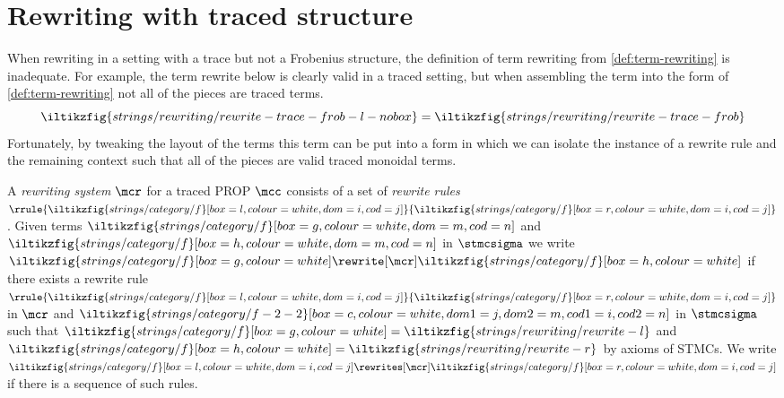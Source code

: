 \section{Rewriting with traced structure}

When rewriting in a setting with a trace but not a Frobenius structure, the
definition of term rewriting from \cref{def:term-rewriting} is inadequate.
For example, the term rewrite below is clearly valid in a traced setting, but
when assembling the term into the form of \cref{def:term-rewriting} not all of
the pieces are traced terms.
\[
    \iltikzfig{strings/rewriting/rewrite-trace-frob-l-nobox}
    =
    \iltikzfig{strings/rewriting/rewrite-trace-frob}
\]
Fortunately, by tweaking the layout of the terms this term can be put into a
form in which we can isolate the instance of a rewrite rule and the remaining
context such that all of the pieces are valid traced monoidal terms.

\begin{definition}\label{def:term-rewriting}
    A \emph{rewriting system} \(\mcr\) for a traced PROP \(\mcc\)
    consists of a set of \emph{rewrite rules} \(
    \rrule{
        \iltikzfig{strings/category/f}[box=l,colour=white,dom=i,cod=j]
    }{
        \iltikzfig{strings/category/f}[box=r,colour=white,dom=i,cod=j]
    }
    \).
    Given terms \(
    \iltikzfig{strings/category/f}[box=g,colour=white,dom=m,cod=n]
    \) and \(
    \iltikzfig{strings/category/f}[box=h,colour=white,dom=m,cod=n]
    \) in \(\stmcsigma\) we write \(
    \iltikzfig{strings/category/f}[box=g,colour=white]
    \rewrite[\mcr]
    \iltikzfig{strings/category/f}[box=h,colour=white]
    \) if there exists a rewrite rule \(\rrule{
        \iltikzfig{strings/category/f}[box=l,colour=white,dom=i,cod=j]
    }{
        \iltikzfig{strings/category/f}[box=r,colour=white,dom=i,cod=j]
    }\) in \(\mcr\) and \(
    \iltikzfig{strings/category/f-2-2}[box=c,colour=white,dom1=j,dom2=m,cod1=i,cod2=n]
    \) in \(\stmcsigma\) such that \(
    \iltikzfig{strings/category/f}[box=g,colour=white]
    =
    \iltikzfig{strings/rewriting/rewrite-l}
    \) and \(
    \iltikzfig{strings/category/f}[box=h,colour=white]
    =
    \iltikzfig{strings/rewriting/rewrite-r}
    \) by axioms of STMCs.
    We write \(
    \iltikzfig{strings/category/f}[box=l,colour=white,dom=i,cod=j]
    \rewrites[\mcr]
    \iltikzfig{strings/category/f}[box=r,colour=white,dom=i,cod=j]
    \) if there is a sequence of such rules.
\end{definition}


